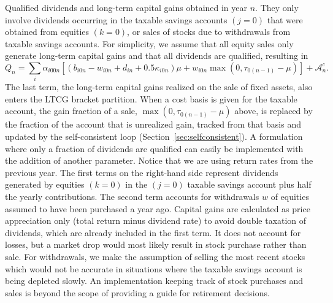 \documentclass[fleqn,12pt]{report}
\begin{document}
\begin{description}[leftmargin=4em,style=multiline]
\item [$Q_n$]
	Qualified dividends and long-term capital gains obtained in year $n$.
	They only involve dividends occurring in the taxable savings accounts $(j=0)$ that
	were obtained from equities $(k=0)$, or sales of stocks due to withdrawals
	from taxable savings accounts.
	For simplicity, we assume that all equity sales only generate long-term capital gains and
	that all dividends are qualified, resulting in
	\begin{equation}
		\label{Eq:Qx2}
		Q_n = \sum_i \alpha_{i00n}\left[(b_{i0n} - w_{i0n} + d_{in} + 0.5\kappa_{i0n})\mu +
		w_{i0n}{\max(0, \tau_{0(n-1)} - \mu)}\right] + \mathcal{A}^c_n.
	\end{equation}
	The last term, the long-term capital gains realized on the sale of fixed assets, also
	enters the LTCG bracket partition.
	When a cost basis is given for the taxable account, the gain fraction of a sale,
	$\max(0, \tau_{0(n-1)} - \mu)$ above, is replaced by the fraction of the account that is
	unrealized gain, tracked from that basis and updated by the self-consistent loop
	(Section~\ref{sec:selfconsistent}).
	A formulation where only a fraction of dividends are qualified can easily be
	implemented with the addition of another parameter.
	Notice that we are using return rates from the previous year.
	The first terms on the right-hand side represent dividends generated by
        equities $(k=0)$ in the $(j=0)$ taxable savings account plus
	half the yearly contributions. The second term accounts for withdrawals $w$
        of equities assumed to have been purchased a year ago.
	Capital gains are calculated as price appreciation only (total return minus dividend rate)
	to avoid double taxation of dividends, which are already included in the first term. 
	It does not account for losses, but a market drop
	would most likely result in stock purchase rather than sale.
	For withdrawals, we make the assumption of
	selling the most recent stocks which would not be accurate in situations where
	the taxable savings account is being depleted slowly. An implementation keeping track
	of stock purchases and sales is beyond the scope of providing a guide for retirement decisions.


\end{description}
\end{document}
